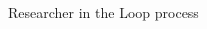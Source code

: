 \documentclass[9pt,aspectratio=169]{beamer}
\begin{document}
\begin{frame}{Researcher in the Loop process}
\begin{columns}
\begin{column}{0.382\linewidth}
\begin{figure}
		\end{figure}
	\end{column}
\end{columns}

\end{frame}
\end{document}
